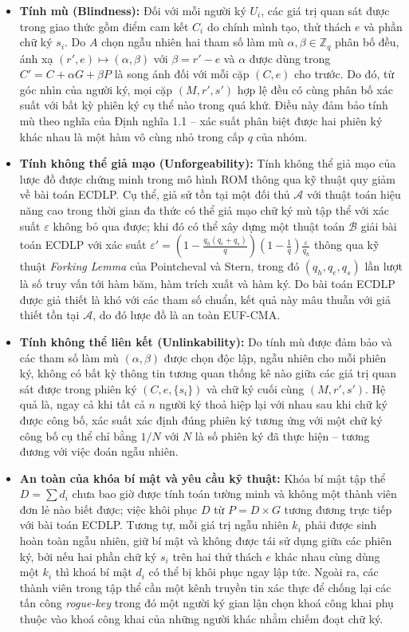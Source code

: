 \begin{itemize}
    \item \textbf{Tính mù (Blindness):} Đối với mỗi người ký $U_i$, các giá trị quan sát được trong giao thức gồm điểm cam kết $C_i$ do chính mình tạo, thử thách $e$ và phần chữ ký $s_i$. Do $A$ chọn ngẫu nhiên hai tham số làm mù $\alpha, \beta \in \mathbb{Z}_q$ phân bố đều, ánh xạ $(r', e) \mapsto (\alpha, \beta)$ với $\beta = r' - e$ và $\alpha$ được dùng trong $C' = C + \alpha G + \beta P$ là song ánh đối với mỗi cặp $(C, e)$ cho trước. Do đó, từ góc nhìn của người ký, mọi cặp $(M, r', s')$ hợp lệ đều có cùng phân bố xác suất với bất kỳ phiên ký cụ thể nào trong quá khứ. Điều này đảm bảo tính mù theo nghĩa của Định nghĩa 1.1 -- xác suất phân biệt được hai phiên ký khác nhau là một hàm vô cùng nhỏ trong cấp $q$ của nhóm.

    \item \textbf{Tính không thể giả mạo (Unforgeability):} Tính không thể giả mạo của lược đồ được chứng minh trong mô hình ROM thông qua kỹ thuật quy giảm về bài toán ECDLP. Cụ thể, giả sử tồn tại một đối thủ $\mathcal{A}$ với thuật toán hiệu năng cao trong thời gian đa thức có thể giả mạo chữ ký mù tập thể với xác suất $\varepsilon$ không bỏ qua được; khi đó có thể xây dựng một thuật toán $\mathcal{B}$ giải bài toán ECDLP với xác suất $\varepsilon' = \left(1 - \frac{q_h(q_e + q_s)}{q}\right)\left(1 - \frac{1}{q}\right)\frac{\varepsilon}{q_h}$ thông qua kỹ thuật \textit{Forking Lemma} của Pointcheval và Stern, trong đó $(q_h, q_e, q_s)$ lần lượt là số truy vấn tới hàm băm, hàm trích xuất và hàm ký. Do bài toán ECDLP được giả thiết là khó với các tham số chuẩn, kết quả này mâu thuẫn với giả thiết tồn tại $\mathcal{A}$, do đó lược đồ là an toàn EUF-CMA.

    \item \textbf{Tính không thể liên kết (Unlinkability):} Do tính mù được đảm bảo và các tham số làm mù $(\alpha, \beta)$ được chọn độc lập, ngẫu nhiên cho mỗi phiên ký, không có bất kỳ thông tin tương quan thống kê nào giữa các giá trị quan sát được trong phiên ký $(C, e, \{s_i\})$ và chữ ký cuối cùng $(M, r', s')$. Hệ quả là, ngay cả khi tất cả $n$ người ký thoả hiệp lại với nhau sau khi chữ ký được công bố, xác suất xác định đúng phiên ký tương ứng với một chữ ký công bố cụ thể chỉ bằng $1/N$ với $N$ là số phiên ký đã thực hiện -- tương đương với việc đoán ngẫu nhiên.

    \item \textbf{An toàn của khóa bí mật và yêu cầu kỹ thuật:} Khóa bí mật tập thể $D = \sum d_i$ chưa bao giờ được tính toán tường minh và không một thành viên đơn lẻ nào biết được; việc khôi phục $D$ từ $P = D \times G$ tương đương trực tiếp với bài toán ECDLP. Tương tự, mỗi giá trị ngẫu nhiên $k_i$ phải được sinh hoàn toàn ngẫu nhiên, giữ bí mật và không được tái sử dụng giữa các phiên ký, bởi nếu hai phần chữ ký $s_i$ trên hai thử thách $e$ khác nhau cùng dùng một $k_i$ thì khoá bí mật $d_i$ có thể bị khôi phục ngay lập tức. Ngoài ra, các thành viên trong tập thể cần một kênh truyền tin xác thực để chống lại các tấn công \textit{rogue-key} trong đó một người ký gian lận chọn khoá công khai phụ thuộc vào khoá công khai của những người khác nhằm chiếm đoạt chữ ký.
\end{itemize}

